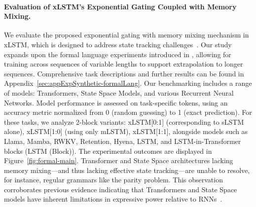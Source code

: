 \paragraph{Evaluation of xLSTM's Exponential Gating Coupled with Memory Mixing.} We evaluate the proposed exponential gating with memory mixing mechanism in xLSTM, which is designed to address state tracking challenges~\citep{Merrill:24, Merrill:23}. Our study expands upon the formal language experiments introduced in \citet{Deletang:23}, allowing for training across sequences of variable lengths to support extrapolation to longer sequences. Comprehensive task descriptions and further results can be found in Appendix~\ref{sec:appExpSynthetic-formalLang}. Our benchmarking includes a range of models: Transformers, State Space Models, and various Recurrent Neural Networks. Model performance is assessed on task-specific tokens, using an accuracy metric normalized from 0 (random guessing) to 1 (exact prediction). For these tasks, we analyze 2-block variants: xLSTM[0:1] (corresponding to sLSTM alone), xLSTM[1:0] (using only mLSTM), xLSTM[1:1], alongside models such as Llama, Mamba, RWKV, Retention, Hyena, LSTM, and LSTM-in-Transformer blocks (LSTM (Block)). The experimental outcomes are displayed in Figure~\ref{fig:formal-main}. Transformer and State Space architectures lacking memory mixing—and thus lacking effective state tracking—are unable to resolve, for instance, regular grammars like the parity problem. This observation corroborates previous evidence indicating that Transformers and State Space models have inherent limitations in expressive power relative to RNNs~\citep{Merrill:24, Merrill:23, Deletang:23}.

